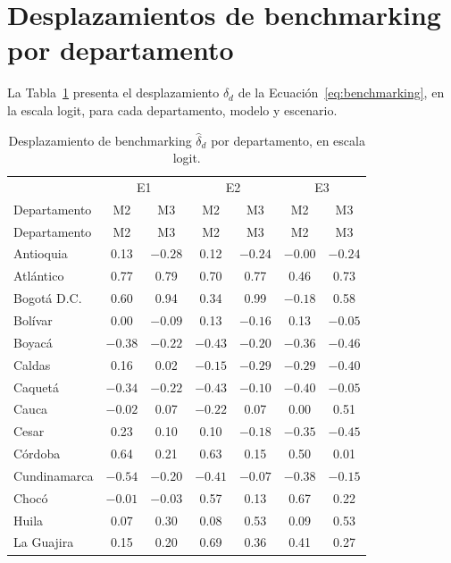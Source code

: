 \section{Desplazamientos de benchmarking por departamento}
\label{sec:apendice-benchmarking}

La Tabla~\ref{tab:delta-dep} presenta el desplazamiento $\hat{\delta}_d$ de la Ecuación~\ref{eq:benchmarking}, en la escala logit, para cada departamento, modelo y escenario.

\footnotesize
\begin{longtable}{l c c c c c c}
\caption{Desplazamiento de benchmarking $\hat{\delta}_d$ por departamento, en escala logit.}
\label{tab:delta-dep}\\
\hline
 & \multicolumn{2}{c}{E1} & \multicolumn{2}{c}{E2} & \multicolumn{2}{c}{E3} \\
Departamento & M2 & M3 & M2 & M3 & M2 & M3 \\
\hline
\endfirsthead
\hline
Departamento & M2 & M3 & M2 & M3 & M2 & M3 \\
\hline
\endhead
\hline
\endfoot
Antioquia & 0.13 & $-0.28$ & 0.12 & $-0.24$ & $-0.00$ & $-0.24$ \\
Atlántico & 0.77 & 0.79 & 0.70 & 0.77 & 0.46 & 0.73 \\
Bogotá D.C. & 0.60 & 0.94 & 0.34 & 0.99 & $-0.18$ & 0.58 \\
Bolívar & 0.00 & $-0.09$ & 0.13 & $-0.16$ & 0.13 & $-0.05$ \\
Boyacá & $-0.38$ & $-0.22$ & $-0.43$ & $-0.20$ & $-0.36$ & $-0.46$ \\
Caldas & 0.16 & 0.02 & $-0.15$ & $-0.29$ & $-0.29$ & $-0.40$ \\
Caquetá & $-0.34$ & $-0.22$ & $-0.43$ & $-0.10$ & $-0.40$ & $-0.05$ \\
Cauca & $-0.02$ & 0.07 & $-0.22$ & 0.07 & 0.00 & 0.51 \\
Cesar & 0.23 & 0.10 & 0.10 & $-0.18$ & $-0.35$ & $-0.45$ \\
Córdoba & 0.64 & 0.21 & 0.63 & 0.15 & 0.50 & 0.01 \\
Cundinamarca & $-0.54$ & $-0.20$ & $-0.41$ & $-0.07$ & $-0.38$ & $-0.15$ \\
Chocó & $-0.01$ & $-0.03$ & 0.57 & 0.13 & 0.67 & 0.22 \\
Huila & 0.07 & 0.30 & 0.08 & 0.53 & 0.09 & 0.53 \\
La Guajira & 0.15 & 0.20 & 0.69 & 0.36 & 0.41 & 0.27 \\

\end{longtable}
